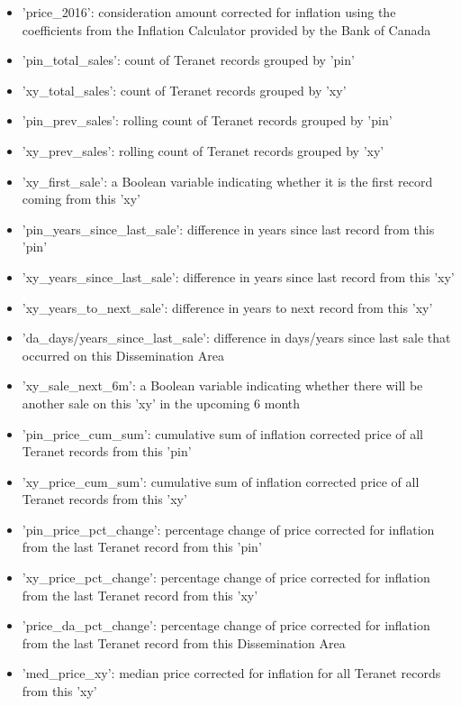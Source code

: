 \begin{itemize}
    \item 'price\_2016': consideration amount corrected for inflation using the coefficients from the Inflation Calculator provided by the Bank of Canada\cite{BankofCanada2019}
    \item 'pin\_total\_sales': count of Teranet records grouped by 'pin'
    \item 'xy\_total\_sales': count of Teranet records grouped by 'xy'
    \item 'pin\_prev\_sales': rolling count of Teranet records grouped by 'pin'
    \item 'xy\_prev\_sales': rolling count of Teranet records grouped by 'xy'
    \item 'xy\_first\_sale': a Boolean variable indicating whether it is the first record coming from this 'xy'
    \item 'pin\_years\_since\_last\_sale': difference in years since last record from this 'pin'
    \item 'xy\_years\_since\_last\_sale': difference in years since last record from this 'xy'
    \item 'xy\_years\_to\_next\_sale': difference in years to next record from this 'xy'
    \item 'da\_days/years\_since\_last\_sale': difference in days/years since last sale that occurred on this Dissemination Area
    \item 'xy\_sale\_next\_6m': a Boolean variable indicating whether there will be another sale on this 'xy' in the upcoming 6 month
    \item 'pin\_price\_cum\_sum': cumulative sum of inflation corrected price of all Teranet records from this 'pin'
    \item 'xy\_price\_cum\_sum': cumulative sum of inflation corrected price of all Teranet records from this 'xy'
    \item 'pin\_price\_pct\_change': percentage change of price corrected for inflation from the last Teranet record from this 'pin'
    \item 'xy\_price\_pct\_change': percentage change of price corrected for inflation from the last Teranet record from this 'xy'
    \item 'price\_da\_pct\_change': percentage change of price corrected for inflation from the last Teranet record from this Dissemination Area
    \item 'med\_price\_xy': median price corrected for inflation for all Teranet records from this 'xy'

\end{itemize}
